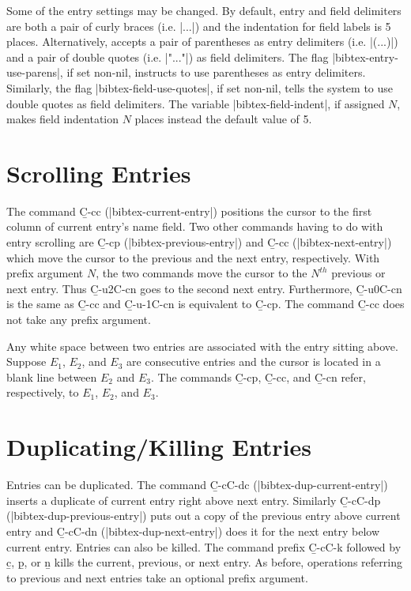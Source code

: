 \noindent
Some of the entry settings may be changed.  By default, entry and field 
delimiters are both a pair of curly braces (i.e. |{...}|) and the
indentation for field labels is 5 places.  Alternatively,
{\BibTeX} accepts a pair of parentheses as entry 
delimiters (i.e. |(...)|) and a pair of double quotes (i.e. |"..."|)
as field delimiters.  The flag |bibtex-entry-use-parens|,
if set non-nil, instructs {\BM} to use parentheses as entry delimiters.
Similarly, the flag |bibtex-field-use-quotes|, if set non-nil, tells
the system to use double quotes as field delimiters.
The variable |bibtex-field-indent|, if assigned $N$, makes
field indentation $N$ places instead the default value of 5.

\section{Scrolling Entries}

\noindent
The command {\b C-c{\s}c} (|bibtex-current-entry|) positions the 
cursor to the first column of current entry's name field.
Two other commands having to do with entry scrolling
are {\b C-c{\s}p} (|bibtex-previous-entry|) and 
{\b C-c{\s}c} \hbox{(|bibtex-next-entry|)} which move the cursor
to the previous and the next entry, respectively.
With prefix argument $N$, the two commands move the cursor to the
$N^{th}$ previous or next entry.  Thus {\b C-u{\s}2{\s}C-c{\s}n} goes to
the second next entry.  Furthermore, {\b C-u{\s}0{\s}C-c{\s}n} is
the same as {\b C-c{\s}c} and {\b C-u{\s}-1{\s}C-c{\s}n} is equivalent
to {\b C-c{\s}p}.  The command {\b C-c{\s}c} does not take any
prefix argument.  

Any white space between two entries are associated with the 
entry sitting above.  Suppose $E_1$, $E_2$, and $E_3$ are consecutive entries
and the cursor is located in a blank line between $E_2$ and $E_3$.
The commands {\b C-c{\s}p}, {\b C-c{\s}c}, and {\b C-c{\s}n}
refer, respectively, to $E_1$, $E_2$, and $E_3$.

\section{Duplicating/Killing Entries}

\noindent
Entries can be duplicated.  The command {\b C-c{\s}C-d{\s}c}
(|bibtex-dup-current-entry|) inserts a duplicate of current
entry right above next entry.
Similarly {\b C-c{\s}C-d{\s}p} (|bibtex-dup-previous-entry|)
puts out a copy of the previous entry above current entry and
{\b C-c{\s}C-d{\s}n} (|bibtex-dup-next-entry|)
does it for the next entry below current entry.
Entries can also be killed.  The command prefix {\b C-c{\s}C-k}
followed by {\b c}, {\b p}, or {\b n} kills the current, previous,
or next entry.  As before, operations referring to previous and next
entries take an optional prefix argument.


